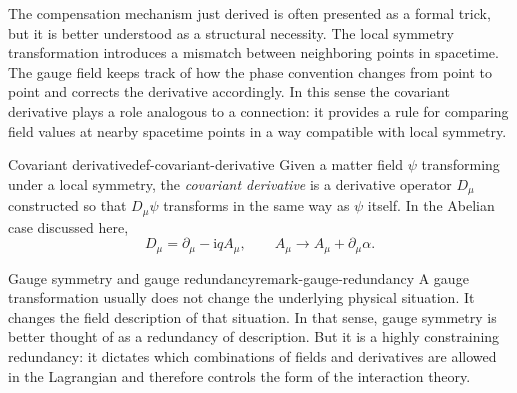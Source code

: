 \documentclass[11pt,a4paper]{article}
\newcommand{\ii}{\mathrm{i}}
\newcommand{\p}{\partial}
\begin{document}
The compensation mechanism just derived is often presented as a formal trick, but it is better understood as a structural necessity. The local symmetry transformation introduces a mismatch between neighboring points in spacetime. The gauge field keeps track of how the phase convention changes from point to point and corrects the derivative accordingly. In this sense the covariant derivative plays a role analogous to a connection: it provides a rule for comparing field values at nearby spacetime points in a way compatible with local symmetry.

\begin{definition}{Covariant derivative}{def-covariant-derivative}
Given a matter field \(\psi\) transforming under a local symmetry, the \emph{covariant derivative} is a derivative operator \(D_\mu\) constructed so that \(D_\mu\psi\) transforms in the same way as \(\psi\) itself. In the Abelian case discussed here,
\[
D_\mu=\p_\mu-\ii qA_\mu,
\qquad
A_\mu\to A_\mu+\p_\mu\alpha.
\]
\end{definition}

\begin{remarkbox}{Gauge symmetry and gauge redundancy}{remark-gauge-redundancy}
A gauge transformation usually does not change the underlying physical situation. It changes the field description of that situation. In that sense, gauge symmetry is better thought of as a redundancy of description. But it is a highly constraining redundancy: it dictates which combinations of fields and derivatives are allowed in the Lagrangian and therefore controls the form of the interaction theory.
\end{remarkbox}

\end{document}
